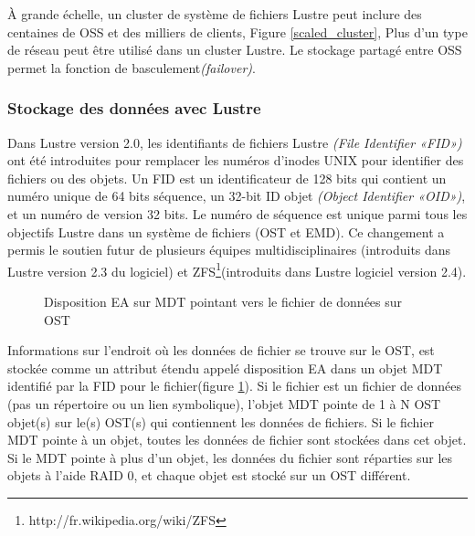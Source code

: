 \documentclass[12pt]{article}
\begin{document}
À grande échelle, un cluster de système de fichiers Lustre peut inclure des centaines de OSS et des milliers de clients, Figure \ref{scaled_cluster}, Plus d'un type de réseau peut être utilisé dans un cluster Lustre. Le stockage partagé entre OSS permet la fonction de basculement\textit{(failover)}.

\subsubsection{Stockage des données avec Lustre}

	Dans Lustre version 2.0, les identifiants de fichiers Lustre \textit{(File Identifier «FID») }ont été introduites pour remplacer les numéros d'inodes UNIX pour identifier des fichiers ou des objets. Un FID est un identificateur de 128 bits qui contient un numéro unique de 64 bits séquence, un 32-bit ID objet \textit{(Object Identifier «OID»)}, et un numéro de version 32 bits. Le numéro de séquence est unique parmi tous les objectifs Lustre dans un système de fichiers (OST et EMD). Ce changement a permis le soutien futur de plusieurs équipes multidisciplinaires (introduits dans Lustre version 2.3 du logiciel) et ZFS\footnote{http://fr.wikipedia.org/wiki/ZFS}(introduits dans Lustre logiciel version 2.4).\\

\begin{figure}[Donnes en Lustre]
\caption{Disposition EA sur MDT pointant vers le fichier de données sur OST}
\label{dataenlustre}
\end{figure}

Informations sur l'endroit où les données de fichier se trouve sur le OST, est stockée comme un attribut étendu appelé disposition EA dans un objet MDT identifié par la FID pour le fichier(figure \ref{dataenlustre}). Si le fichier est un fichier de données (pas un répertoire ou un lien symbolique), l'objet MDT pointe de 1 à N OST objet(s) sur le(s) OST(s) qui contiennent les données de fichiers. Si le fichier MDT pointe à un objet, toutes les données de fichier sont stockées dans cet objet. Si le MDT pointe à plus d'un objet, les données du fichier sont réparties sur les objets à l'aide RAID 0, et chaque objet est stocké sur un OST différent.\\
\end{document}
